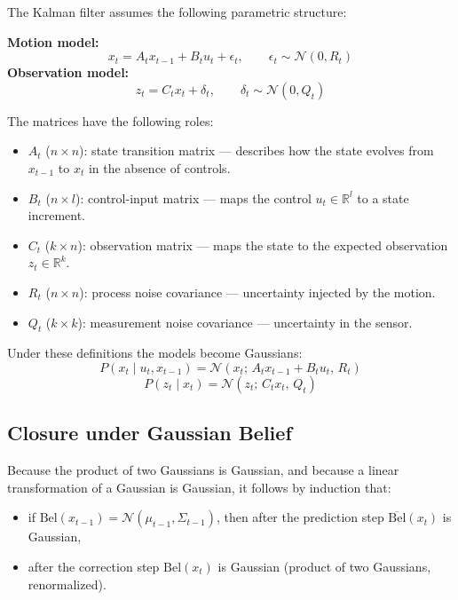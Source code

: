 \documentclass[11pt,a4paper]{article}
\theoremstyle{definition}
\theoremstyle{plain}
\theoremstyle{remark}
\begin{document}
The Kalman filter assumes the following parametric structure:

\begin{tcolorbox}[colback=blue!5!white,colframe=blue!75!black,title=\textbf{KF System Models}]
\textbf{Motion model:}
\[
x_t = A_t x_{t-1} + B_t u_t + \epsilon_t, \qquad \epsilon_t \sim \mathcal{N}(0, R_t)
\]
\textbf{Observation model:}
\[
z_t = C_t x_t + \delta_t, \qquad \delta_t \sim \mathcal{N}(0, Q_t)
\]
\end{tcolorbox}

The matrices have the following roles:
\begin{itemize}
    \item $A_t$ ($n \times n$): state transition matrix — describes how the state evolves from $x_{t-1}$ to $x_t$ in the absence of controls.
    \item $B_t$ ($n \times l$): control-input matrix — maps the control $u_t \in \mathbb{R}^l$ to a state increment.
    \item $C_t$ ($k \times n$): observation matrix — maps the state to the expected observation $z_t \in \mathbb{R}^k$.
    \item $R_t$ ($n \times n$): process noise covariance — uncertainty injected by the motion.
    \item $Q_t$ ($k \times k$): measurement noise covariance — uncertainty in the sensor.
\end{itemize}

Under these definitions the models become Gaussians:
\[
P(x_t \mid u_t, x_{t-1}) = \mathcal{N}(x_t;\, A_t x_{t-1} + B_t u_t,\, R_t)
\]
\[
P(z_t \mid x_t) = \mathcal{N}(z_t;\, C_t x_t,\, Q_t)
\]

\subsection{Closure under Gaussian Belief}

Because the product of two Gaussians is Gaussian, and because a linear transformation of a Gaussian is Gaussian, it follows by induction that:
\begin{itemize}
    \item if $\mathrm{Bel}(x_{t-1}) = \mathcal{N}(\mu_{t-1}, \Sigma_{t-1})$, then after the prediction step $\overline{\mathrm{Bel}}(x_t)$ is Gaussian,
    \item after the correction step $\mathrm{Bel}(x_t)$ is Gaussian (product of two Gaussians, renormalized).
\end{itemize}
\end{document}
